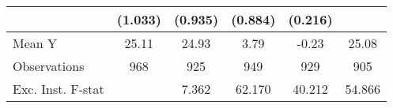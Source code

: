 {\begin{tabular}{l*{5}{c}}
            &     (1.033)         &     (0.935)         &     (0.884)         &     (0.216)         &                     \\
\midrule
Mean Y      &       25.11         &       24.93         &        3.79         &       -0.23         &       25.08         \\
Observations&         968         &         925         &         949         &         929         &         905         \\
Exc. Inst. F-stat&                     &       7.362         &      62.170         &      40.212         &      54.866         \\
\bottomrule
\end{tabular}
}
